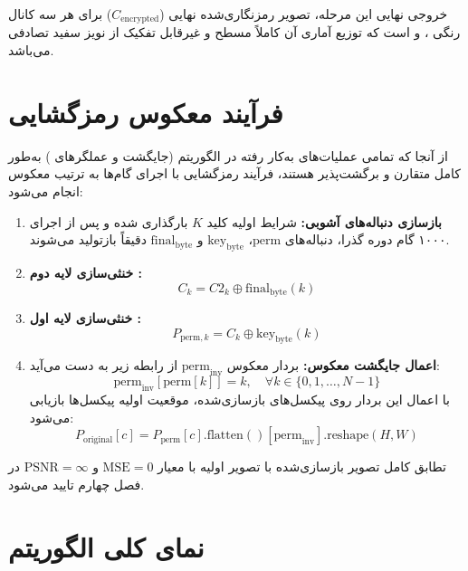 خروجی نهایی این مرحله، تصویر رمزنگاری‌شده نهایی ($C_{\mathrm{encrypted}}$) برای هر سه کانال رنگی ،  و  است که توزیع آماری آن کاملاً مسطح و غیرقابل تفکیک از نویز سفید تصادفی می‌باشد.

\section{فرآیند معکوس رمزگشایی}

از آنجا که تمامی عملیات‌های به‌کار رفته در الگوریتم (جایگشت و عملگرهای ) به‌طور کامل متقارن و برگشت‌پذیر هستند، فرآیند رمزگشایی با اجرای گام‌ها به ترتیب معکوس انجام می‌شود:

\begin{enumerate}
    \item \textbf{بازسازی دنباله‌های آشوبی:} شرایط اولیه کلید $K$ بارگذاری شده و پس از اجرای ۱۰۰۰ گام دوره گذرا، دنباله‌های $\mathrm{perm}$، $\mathrm{key}_{\mathrm{byte}}$ و $\mathrm{final}_{\mathrm{byte}}$ دقیقاً بازتولید می‌شوند.
    \item \textbf{خنثی‌سازی لایه دوم :} 
    \begin{equation}
    C_k = C2_k \oplus \mathrm{final}_{\mathrm{byte}}(k)
    \end{equation}
    \item \textbf{خنثی‌سازی لایه اول :} 
    \begin{equation}
    P_{\mathrm{perm},k} = C_k \oplus \mathrm{key}_{\mathrm{byte}}(k)
    \end{equation}
    \item \textbf{اعمال جایگشت معکوس:} بردار معکوس $\mathrm{perm}_{\mathrm{inv}}$ از رابطه زیر به دست می‌آید:
    \begin{equation}
    \mathrm{perm}_{\mathrm{inv}}[\mathrm{perm}[k]] = k, \quad \forall k \in \{0, 1, \ldots, N-1\}
    \label{eq:ch3-perm-inv}
    \end{equation}
    با اعمال این بردار روی پیکسل‌های بازسازی‌شده، موقعیت اولیه پیکسل‌ها بازیابی می‌شود:
    \begin{equation}
    P_{\mathrm{original}}[c] = P_{\mathrm{perm}}[c].\mathrm{flatten()}[\mathrm{perm}_{\mathrm{inv}}].\mathrm{reshape}(H, W)
    \end{equation}
\end{enumerate}

تطابق کامل تصویر بازسازی‌شده با تصویر اولیه با معیار $\mathrm{MSE}=0$ و $\mathrm{PSNR}=\infty$ در فصل چهارم تایید می‌شود.

\section{نمای کلی الگوریتم}

